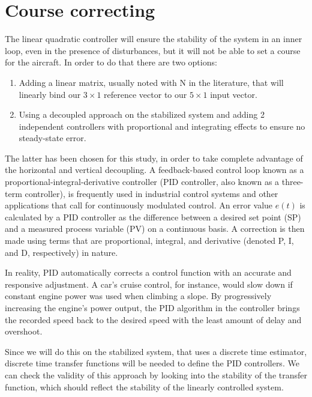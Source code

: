 \documentclass[conference]{IEEEtran}
\begin{document}
\section{Course correcting}
The linear quadratic controller will ensure the stability of the system in an inner loop, even in the presence of disturbances, but it will not be able to set a course for the aircraft. In order to do that there are two options:
\par
\begin{enumerate}
    \item Adding a linear matrix, usually noted with N in the literature, that will
          linearly bind our $3\times1$ reference vector to our $5\times1$ input vector.
    \item Using a decoupled approach on the stabilized system and adding 2 independent
          controllers with proportional and integrating effects to ensure no steady-state
          error.
\end{enumerate}
\par
The latter has been chosen for this study, in order to take complete advantage of the horizontal and vertical decoupling. A feedback-based control loop known as a
proportional-integral-derivative controller (PID controller, also known as a
three-term controller), is frequently used in industrial control systems and
other applications that call for continuously modulated control. An error value
$e(t)$ is calculated by a PID controller as the difference between a desired set
point (SP) and a measured process variable (PV) on a continuous basis. A
correction is then made using terms that are proportional, integral, and
derivative (denoted P, I, and D, respectively) in nature.
\par
In reality, PID automatically corrects a control function with an accurate and
responsive adjustment. A car's cruise control, for instance, would slow down if
constant engine power was used when climbing a slope. By progressively
increasing the engine's power output, the PID algorithm in the controller
brings the recorded speed back to the desired speed with the least amount of
delay and overshoot.
\par
Since we will do this on the stabilized system, that uses a discrete time
estimator, discrete time transfer functions will be needed to define the PID controllers. We can check the
validity of this approach by looking into the stability of the transfer
function, which should reflect the stability of the linearly controlled system.
\par
\end{document}
